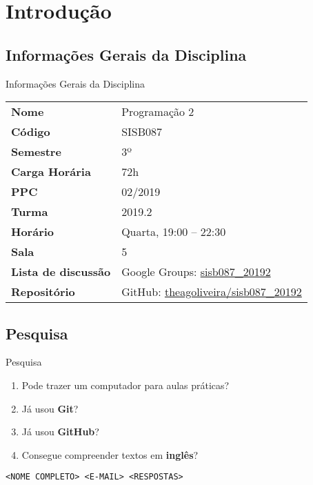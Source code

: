 \section{Introdução}

\subsection{Informações Gerais da Disciplina}

\begin{frame}[fragile]{Informações Gerais da Disciplina}
    \begin{center}
        \begin{tabular}{@{}ll@{}}
            \toprule
            \textbf{Nome} & Programação 2 \\
            \textbf{Código} & SISB087 \\
            \textbf{Semestre} & 3º \\
            \textbf{Carga Horária} & 72h \\
            \textbf{PPC} & 02/2019 \\
            \textbf{Turma} & 2019.2 \\
            \textbf{Horário} & Quarta, 19:00 -- 22:30 \\
            \textbf{Sala} & 5 \\
            \textbf{Lista de discussão} & Google Groups: \href{https://groups.google.com/forum/#!forum/sisb087_20192}{\alert{sisb087\_20192}} \\
            \textbf{Repositório} & GitHub: \href{https://github.com/theagoliveira/sisb087_20192}{\alert{theagoliveira/sisb087\_20192}} \\
            \bottomrule
        \end{tabular}
    \end{center}
\end{frame}

\subsection{Pesquisa}

\begin{frame}{Pesquisa}
    
    \begin{enumerate}
    \item Pode trazer um computador para aulas práticas?
    \item Já usou \textbf{Git}?
    \item Já usou \textbf{GitHub}?
    \item Consegue compreender textos em \textbf{inglês}?
    \end{enumerate}
    
    \bigskip
    \bigskip
    
    \centering
    \texttt{<NOME COMPLETO> <E-MAIL> <RESPOSTAS>}
\end{frame}

